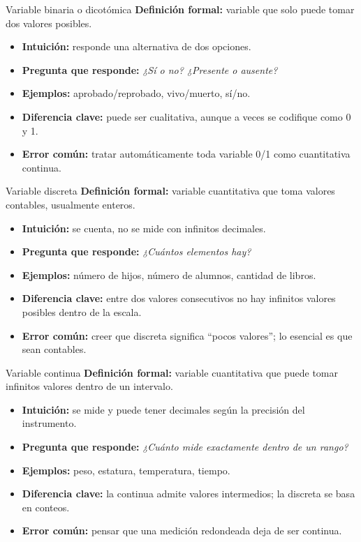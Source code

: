 \documentclass[aspectratio=169,11pt]{beamer}
\newcommand{\pregunta}[1]{\textbf{Pregunta que responde:} \emph{#1}}
\newcommand{\errorcomun}[1]{\textbf{Error común:} #1}
\newcommand{\diferencia}[1]{\textbf{Diferencia clave:} #1}
\begin{document}
\begin{frame}{Variable binaria o dicotómica}
\textbf{Definición formal:} variable que solo puede tomar dos valores posibles.
\begin{itemize}
  \item \textbf{Intuición:} responde una alternativa de dos opciones.
  \item \pregunta{¿Sí o no? ¿Presente o ausente?}
  \item \textbf{Ejemplos:} aprobado/reprobado, vivo/muerto, sí/no.
  \item \diferencia{puede ser cualitativa, aunque a veces se codifique como 0 y 1.}
  \item \errorcomun{tratar automáticamente toda variable 0/1 como cuantitativa continua.}
\end{itemize}
\end{frame}

\begin{frame}{Variable discreta}
\textbf{Definición formal:} variable cuantitativa que toma valores contables, usualmente enteros.
\begin{itemize}
  \item \textbf{Intuición:} se cuenta, no se mide con infinitos decimales.
  \item \pregunta{¿Cuántos elementos hay?}
  \item \textbf{Ejemplos:} número de hijos, número de alumnos, cantidad de libros.
  \item \diferencia{entre dos valores consecutivos no hay infinitos valores posibles dentro de la escala.}
  \item \errorcomun{creer que discreta significa ``pocos valores''; lo esencial es que sean contables.}
\end{itemize}
\end{frame}

\begin{frame}{Variable continua}
\textbf{Definición formal:} variable cuantitativa que puede tomar infinitos valores dentro de un intervalo.
\begin{itemize}
  \item \textbf{Intuición:} se mide y puede tener decimales según la precisión del instrumento.
  \item \pregunta{¿Cuánto mide exactamente dentro de un rango?}
  \item \textbf{Ejemplos:} peso, estatura, temperatura, tiempo.
  \item \diferencia{la continua admite valores intermedios; la discreta se basa en conteos.}
  \item \errorcomun{pensar que una medición redondeada deja de ser continua.}
\end{itemize}
\end{frame}
\end{document}

